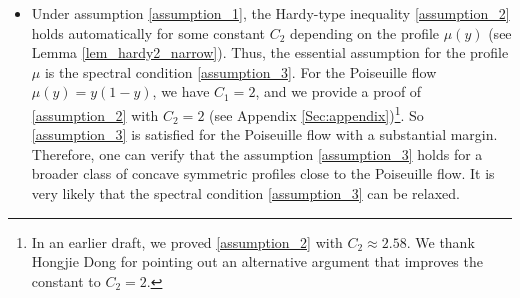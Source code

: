 \documentclass[reqno, 11pt]{amsart}
\theoremstyle{plain}
\theoremstyle{definition}
\theoremstyle{remark}
\numberwithin{equation}{section}
\begin{document}
\begin{itemize}
\begin{figure}[h]
\caption{Two examples of $u_0$ satisfying the assumption \eqref{assumption_L1}}\label{fig:example}
\end{figure}

\item Under assumption \eqref{assumption_1}, the Hardy-type inequality \eqref{assumption_2} holds automatically for some constant $C_2$ depending on the profile $\mu(y)$ (see Lemma \ref{lem_hardy2_narrow}). Thus, the essential assumption for the profile $\mu$ is the spectral condition \eqref{assumption_3}. For the Poiseuille flow $\mu(y) = y(1-y)$, we have $C_1 = 2$, and we provide a proof of \eqref{assumption_2} with $C_2 = 2$ (see Appendix \ref{Sec:appendix})\footnote{In an earlier draft, we proved \eqref{assumption_2} with $C_2 \approx 2.58$. We thank Hongjie Dong for pointing out an alternative argument that improves the constant to $C_2 = 2$.}. So \eqref{assumption_3} is satisfied for the Poiseuille flow with a substantial margin. Therefore, one can verify that the assumption \eqref{assumption_3} holds for a broader class of concave symmetric profiles close to the Poiseuille flow. It is very likely that the spectral condition \eqref{assumption_3} can be relaxed.\\


\end{itemize}
\end{document}
